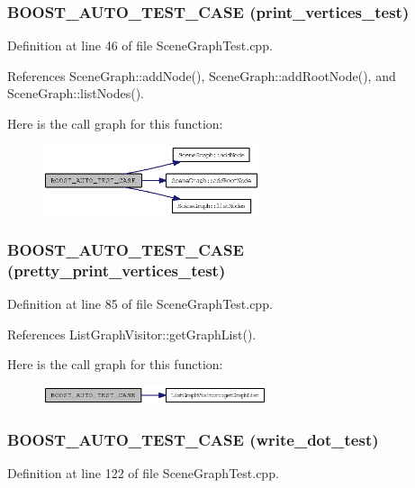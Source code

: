 \subsubsection{\setlength{\rightskip}{0pt plus 5cm}BOOST\_\-AUTO\_\-TEST\_\-CASE (print\_\-vertices\_\-test)}\label{SceneGraphTest_8cpp_950a30b389f81084f419f5614cef9808}




Definition at line 46 of file SceneGraphTest.cpp.

References SceneGraph::addNode(), SceneGraph::addRootNode(), and SceneGraph::listNodes().

Here is the call graph for this function:\nopagebreak
\begin{figure}[H]
\begin{center}
\leavevmode
\includegraphics[width=180pt]{SceneGraphTest_8cpp_950a30b389f81084f419f5614cef9808_cgraph}
\end{center}
\end{figure}
\subsubsection{\setlength{\rightskip}{0pt plus 5cm}BOOST\_\-AUTO\_\-TEST\_\-CASE (pretty\_\-print\_\-vertices\_\-test)}\label{SceneGraphTest_8cpp_be849f12cd2b4efbcb3d9e70c340189d}




Definition at line 85 of file SceneGraphTest.cpp.

References ListGraphVisitor::getGraphList().

Here is the call graph for this function:\nopagebreak
\begin{figure}[H]
\begin{center}
\leavevmode
\includegraphics[width=186pt]{SceneGraphTest_8cpp_be849f12cd2b4efbcb3d9e70c340189d_cgraph}
\end{center}
\end{figure}
\subsubsection{\setlength{\rightskip}{0pt plus 5cm}BOOST\_\-AUTO\_\-TEST\_\-CASE (write\_\-dot\_\-test)}\label{SceneGraphTest_8cpp_1552d87c5d441210b23d3a67d4d83568}




Definition at line 122 of file SceneGraphTest.cpp.
